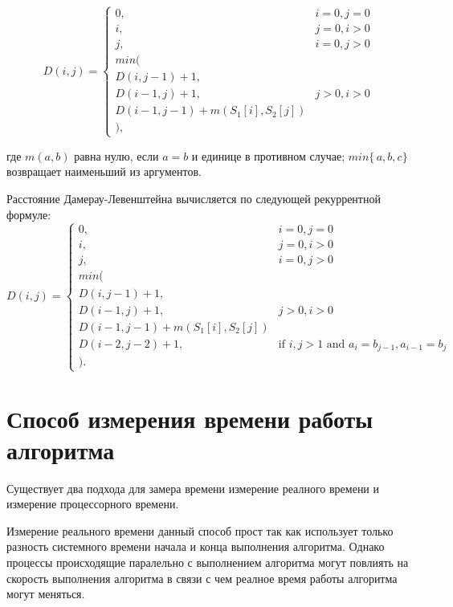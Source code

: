 \documentclass[12pt]{report}
\begin{document}
\begin{displaymath}
D(i,j) = \left\{ \begin{array}{ll}
 0, & \textrm{$i = 0, j = 0$}\\
 i, & \textrm{$j = 0, i > 0$}\\
 j, & \textrm{$i = 0, j > 0$}\\
min(\\
D(i,j-1)+1,\\
D(i-1, j) +1, &\textrm{$j>0, i>0$}\\
D(i-1, j-1) + m(S_{1}[i], S_{2}[j])\\
),
  \end{array} \right.
\end{displaymath}

где $m(a,b)$ равна нулю, если $a=b$ и единице в противном случае; $min\{\,a,b,c\}$ возвращает наименьший из аргументов.

Расстояние Дамерау-Левенштейна вычисляется по следующей рекуррентной формуле:
\begin{displaymath}
D(i,j) = \left\{ \begin{array}{ll}
 0, & \textrm{$i = 0, j = 0$}\\
 i, & \textrm{$j = 0, i > 0$}\\
 j, & \textrm{$i = 0, j > 0$}\\
min(\\
D(i,j-1)+1,\\
D(i-1, j) +1, &\textrm{$j>0, i>0$}\\
D(i-1, j-1) + m(S_{1}[i], S_{2}[j])\\
D(i-2, j-2) + 1, &\textrm{if $i,j>1$ and $a_{i} = b_{j-1},a_{i-1}=b_{j} $}\\
).
  \end{array} \right.
\end{displaymath}

\section{Способ измерения времени работы алгоритма}
Существует два подхода для замера времени измерение реалного времени и измерение процессорного времени.

Измерение реального времени данный способ прост так как использует только разность системного времени начала и конца выполнения алгоритма. Однако процессы происходящие паралельно с выполнением алгоритма могут повлиять на скорость выполнения алгоритма в связи с чем реалное время работы алгоритма могут меняться.
\end{document}
